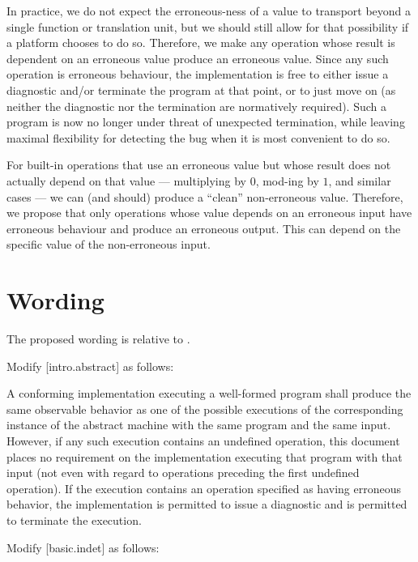 In practice, we do not expect the erroneous-ness of a value to transport beyond a single function or translation unit, but we should still allow for that possibility if a platform chooses to do so.   Therefore, we make any operation whose result is dependent on an erroneous value produce an erroneous value. Since any such operation is erroneous behaviour, the implementation is free to either issue a diagnostic and/or terminate the program at that point, or to just move on (as neither the diagnostic nor the termination are normatively required). Such a program is now no longer under threat of unexpected termination, while leaving maximal flexibility for detecting the bug when it is most convenient to do so.

For built-in operations that use an erroneous value but whose result does not actually depend on that value --- multiplying by $0$, mod-ing by $1$, and similar cases --- we can (and should) produce a ``clean'' non-erroneous value.  Therefore, we propose that only operations whose value depends on an erroneous input have erroneous behaviour and produce an erroneous output. This can depend on the specific value of the non-erroneous input.

\section{Wording}

The proposed wording is relative to \cite{N5014}. 

Modify [intro.abstract] as follows:

\begin{adjustwidth}{0.5cm}{0.5cm}
A conforming implementation executing a well-formed program shall produce the same observable behavior as one of the possible executions of the corresponding instance of the abstract machine with the same program and the same input. However, if any such execution contains an undefined operation, this document places no requirement on the implementation executing that program with that input (not even with regard to operations preceding the first undefined operation). If the execution contains an operation specified as having erroneous behavior, the implementation is permitted to issue a diagnostic and is permitted to terminate the execution.
\end{adjustwidth}


Modify [basic.indet] as follows:

